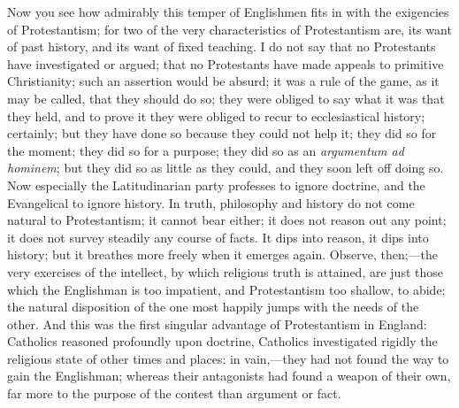 Now you see how admirably this temper of Englishmen
fits in with the exigencies of Protestantism; for two of
the very characteristics of Protestantism are, its want
of past history, and its want of fixed teaching. I do not
say that no Protestants have investigated or argued; that
no Protestants have made appeals to primitive
Christianity; such an assertion would be absurd; it was a
rule of the game, as it may be called, that they should
do so; they were obliged to say what it was that they
held, and to prove it they were obliged to recur to
ecclesiastical history; certainly; but they have done so
because they could not help it; they did so for the
moment; they did so for a purpose; they did so as an \emph{argumentum
ad hominem}; but they did so as little as they could,
and they soon left off doing so. Now especially the
Latitudinarian party professes to ignore doctrine, and
the Evangelical to ignore history. In truth, philosophy
and history do not come natural to Protestantism; it
cannot bear either; it does not reason out any point; it
does not survey steadily any course of facts. It dips
into reason, it dips into history; but it breathes more
freely when it emerges again. Observe, then;—the
very exercises of the intellect, by which religious truth
is attained, are just those which the Englishman is too
impatient, and Protestantism too shallow, to abide; the
natural disposition of the one most happily jumps with
the needs of the other. And this was the first singular
advantage of Protestantism in England: Catholics reasoned
profoundly upon doctrine, Catholics investigated rigidly
the religious state of other times and places: in
vain,—they had not found the way to gain the
Englishman; whereas their antagonists had found a weapon
of their own, far more to the purpose of the contest than
argument or fact.

